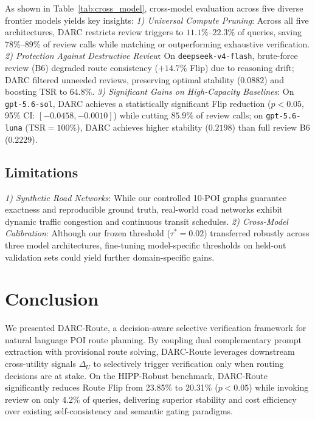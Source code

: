 \documentclass[conference]{IEEEtran}
\begin{document}
As shown in Table~\ref{tab:cross_model}, cross-model evaluation across five diverse frontier models yields key insights:
\textit{1) Universal Compute Pruning}: Across all five architectures, DARC restricts review triggers to $11.1\%$--$22.3\%$ of queries, saving $78\%$--$89\%$ of review calls while matching or outperforming exhaustive verification.
\textit{2) Protection Against Destructive Review}: On \texttt{deepseek-v4-flash}, brute-force review (B6) degraded route consistency ($+14.7\%$ Flip) due to reasoning drift; DARC filtered unneeded reviews, preserving optimal stability ($0.0882$) and boosting TSR to $64.8\%$.
\textit{3) Significant Gains on High-Capacity Baselines}: On \texttt{gpt-5.6-sol}, DARC achieves a statistically significant Flip reduction ($p < 0.05$, 95\% CI: $[-0.0458, -0.0010]$) while cutting $85.9\%$ of review calls; on \texttt{gpt-5.6-luna} ($\text{TSR}=100\%$), DARC achieves higher stability ($0.2198$) than full review B6 ($0.2229$).

\subsection{Limitations}
\textit{1) Synthetic Road Networks}: While our controlled 10-POI graphs guarantee exactness and reproducible ground truth, real-world road networks exhibit dynamic traffic congestion and continuous transit schedules.
\textit{2) Cross-Model Calibration}: Although our frozen threshold ($\tau^*=0.02$) transferred robustly across three model architectures, fine-tuning model-specific thresholds on held-out validation sets could yield further domain-specific gains.

\section{Conclusion}

We presented DARC-Route, a decision-aware selective verification framework for natural language POI route planning. By coupling dual complementary prompt extraction with provisional route solving, DARC-Route leverages downstream cross-utility signals $\Delta_U$ to selectively trigger verification only when routing decisions are at stake. On the HIPP-Robust benchmark, DARC-Route significantly reduces Route Flip from 23.85\% to 20.31\% ($p < 0.05$) while invoking review on only 4.2\% of queries, delivering superior stability and cost efficiency over existing self-consistency and semantic gating paradigms.



\end{document}
